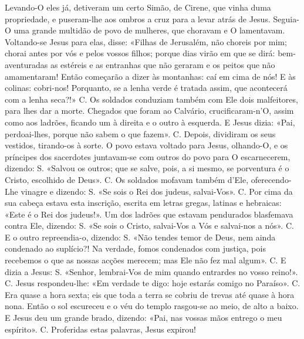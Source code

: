 \begin{paracol}{2}
{Levando-O eles já, detiveram um certo Simão, de Cirene, que vinha duma propriedade, e puseram-lhe aos ombros a cruz para a levar atrás de Jesus. Seguia-O uma grande multidão de povo de mulheres, que choravam e O lamentavam. Voltando-se Jesus para elas, disse: \cruz «Filhas de Jerusalém, não choreis por mim; chorai antes por vós e pelos vossos filhos; porque dias virão em que se dirá: bem-aventuradas as estéreis e as entranhas que não geraram e os peitos que não amamentaram! Então começarão a dizer às montanhas: caí em cima de nós! E às colinas: cobri-nos! Porquanto, se a lenha verde é tratada assim, que acontecerá com a lenha seca?!» {\redx C.} Os soldados conduziam também com Ele dois malfeitores, para lhes dar a morte. Chegados que foram ao Calvário, crucificaram-n’O, assim como aos ladrões, ficando um à direita e o outro à esquerda. E Jesus dizia: \cruz «Pai, perdoai-lhes, porque não sabem o que fazem». {\redx C.} Depois, dividiram os seus vestidos, tirando-os à sorte. O povo estava voltado para Jesus, olhando-O, e os príncipes dos sacerdotes juntavam-se com outros do povo para O escarnecerem, dizendo: {\redx S.} «Salvou os outros; que se salve, pois, a si mesmo, se porventura é o Cristo, escolhido de Deus». {\redx C.} Os soldados mofavam também d’Ele, oferecendo-Lhe vinagre e dizendo: {\redx S.} «Se sois o Rei dos judeus, salvai-Vos». {\redx C.} Por cima da sua cabeça estava esta inscrição, escrita em letras gregas, latinas e hebraicas: «Este é o Rei dos judeus!». Um dos ladrões que estavam pendurados blasfemava contra Ele, dizendo: {\redx S.} «Se sois o Cristo, salvai-Vos a Vós e salvai-nos a nós». {\redx C.} E o outro repreendia-o, dizendo: {\redx S.} «Não tendes temor de Deus, nem ainda condenado ao suplício?! Na verdade, fomos condenados com justiça, pois recebemos o que as nossas acções merecem; mas Ele não fez mal algum». {\redx C.} E dizia a Jesus: {\redx S.} «Senhor, lembrai-Vos de mim quando entrardes no vosso reino!». {\redx C.} Jesus respondeu-lhe: \cruz «Em verdade te digo: hoje estarás comigo no Paraíso». {\redx C.} Era quase a hora sexta; eis que toda a terra se cobriu de trevas até quase à hora nona. Então o sol escureceu e o véu do templo rasgou-se ao meio, de alto a baixo. E Jesus deu um grande brado, dizendo: \cruz «Pai, nas vossas mãos entrego o meu espírito». {\redx C.} Proferidas estas palavras, Jesus expirou!
}\switchcolumn*{}\switchcolumn{}\switchcolumn*{}
\end{paracol}
